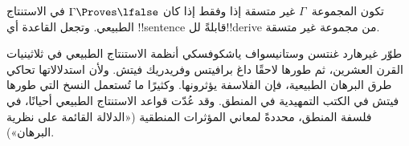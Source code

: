 \documentclass[../../../include/open-logic-section]{subfiles}
\begin{document}
تكون المجموعة~$\Gamma$ غير متسقة إذا وفقط إذا كان
$\Gamma \Proves \lfalse$ في الاستنتاج الطبيعي. وتجعل القاعدة
\FalseInt{} أي !!{sentence} قابلةً لل!!{derive} من مجموعة غير
متسقة.

طوّر غيرهارد غنتسن وستانيسواف ياشكوفسكي أنظمة الاستنتاج الطبيعي في
ثلاثينيات القرن العشرين، ثم طورها لاحقًا داغ برافيتس وفريدريك فيتش.
ولأن استدلالاتها تحاكي طرق البرهان الطبيعية، فإن الفلاسفة يؤثرونها.
وكثيرًا ما تُستعمل النسخ التي طورها فيتش في الكتب التمهيدية في
المنطق. وقد عُدّت قواعد الاستنتاج الطبيعي أحيانًا، في فلسفة المنطق،
محددةً لمعاني المؤثرات المنطقية («الدلالة القائمة على نظرية
البرهان»).
\end{document}
